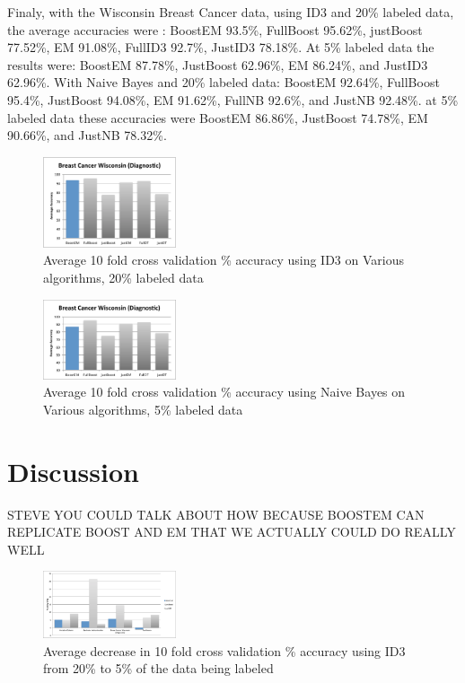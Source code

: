 \documentclass{sig-alternate}
\begin{document}
Finaly, with the Wisconsin Breast Cancer data, using ID3 and 20\% labeled data, the average accuracies were : BoostEM 93.5\%, FullBoost 95.62\%, justBoost 77.52\%, EM 91.08\%, FullID3 92.7\%, JustID3 78.18\%. At 5\% labeled data the results were: BoostEM 87.78\%, JustBoost 62.96\%, EM 86.24\%, and JustID3 62.96\%.
With Naive Bayes and 20\% labeled data: BoostEM 92.64\%, FullBoost 95.4\%, JustBoost 94.08\%, EM 91.62\%, FullNB 92.6\%, and JustNB 92.48\%. at 5\% labeled data these accuracies were BoostEM 86.86\%, JustBoost 74.78\%, EM 90.66\%, and JustNB 78.32\%.
\begin{figure}[ht!]
\centering
\includegraphics[width=0.35\textwidth]{figures/breaAcc.pdf}
\caption{Average 10 fold cross validation \% accuracy using ID3 on Various algorithms, 20\% labeled data}
\label{breaAcc}
\end{figure}
\begin{figure}[ht!]
\centering
\includegraphics[width=0.35\textwidth]{figures/breaAcc5.pdf}
\caption{Average 10 fold cross validation \% accuracy using Naive Bayes on Various algorithms, 5\% labeled data}
\label{breaAcc5}
\end{figure}
 

\section{Discussion}
STEVE 
YOU COULD TALK ABOUT HOW BECAUSE BOOSTEM CAN REPLICATE BOOST AND EM THAT WE ACTUALLY COULD DO REALLY WELL

\begin{figure}
\centering
\includegraphics[width=0.35\textwidth]{figures/accDrops.pdf}
\caption{Average decrease in 10 fold cross validation \% accuracy using ID3 from 20\% to 5\% of the data being labeled}
\label{accDrop}
\end{figure}
\end{document}
